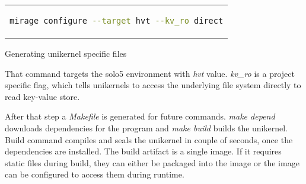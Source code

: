 \begin{code}[htpb]
    \centering
    \begin{tabular}{c}
    \begin{lstlisting}[language=bash]
      mirage configure --target hvt --kv_ro direct
  \end{lstlisting}
  \end{tabular}
  \caption{Generating unikernel specific files}\label{fig:mirage_configure}
\end{code}

That command targets the solo5 environment with \textit{hvt} value. \textit{kv\_ro} is a project specific flag, which tells unikernels to access the underlying file system directly to read key-value store.

After that step a \textit{Makefile} is generated for future commands. \textit{make depend} downloads dependencies for the program and \textit{make build} builds the unikernel. Build command compiles and seals the unikernel in couple of seconds, once the dependencies are installed. The build artifact is a single image. If it requires static files during build, they can either be packaged into the image or the image can be configured to access them during runtime.

